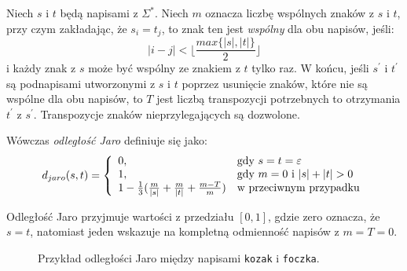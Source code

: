 \documentclass{praca1}
\begin{document}
\begin{definition}
Niech $s$ i $t$ będą napisami z $\Sigma^*$. Niech $m$ oznacza liczbę wspólnych znaków z $s$ i $t$, przy czym zakładając, że $s_i = t_j$, to znak ten jest \emph{wspólny} dla obu napisów, jeśli:
\begin{equation*}
|i -j| < \Bigg\lfloor\frac{max\{|s|, |t|\}}{2}\Bigg\rfloor
\end{equation*}
i każdy znak z $s$ może być wspólny ze znakiem z $t$ tylko raz. W końcu, jeśli $s^\prime$ i $t^\prime$ są podnapisami utworzonymi z $s$ i $t$ poprzez usunięcie znaków, które nie są wspólne dla obu napisów, to $T$ jest liczbą transpozycji potrzebnych to otrzymania $t^\prime$ z $s^\prime$. Transpozycje znaków nieprzylegających są dozwolone.

Wówczas \emph{odległość Jaro} definiuje się jako:
\begin{equation}
\label{eq:011}
d_{jaro}(s,t) = \left\{
\begin{array}{l l}     
    0, & \text{gdy } s = t = \varepsilon \\
    1, & \text{gdy } m = 0 \text{ i } |s| + |t| > 0 \\
    1 - \frac{1}{3} (\frac{m}{|s|} + \frac{m}{|t|} + \frac{m - T}{m}) & \text{w przeciwnym przypadku}
\end{array}\right.
\end{equation}
\end{definition}

Odległość Jaro przyjmuje wartości z przedziału $[0,1]$, gdzie zero oznacza, że $s = t$, natomiast jeden wskazuje na kompletną odmienność napisów z $m = T = 0$.


\begin{figure}[width=80pt]
\centering
{}
\cprotect\caption{Przykład odległości Jaro między napisami \verb|kozak| i \verb|foczka|.}\label{rys:005}
\end{figure}
\end{document}
